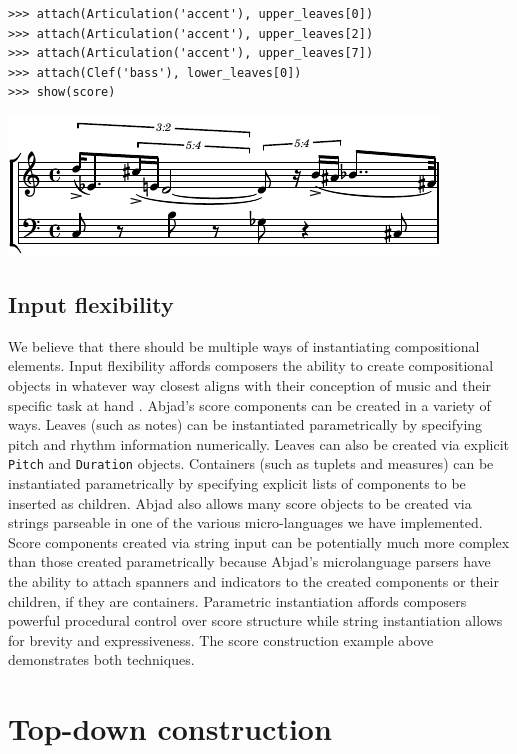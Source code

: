 \documentclass{article}
\begin{document}
\begin{lstlisting}
>>> attach(Articulation('accent'), upper_leaves[0])
>>> attach(Articulation('accent'), upper_leaves[2])
>>> attach(Articulation('accent'), upper_leaves[7])
>>> attach(Clef('bass'), lower_leaves[0])
>>> show(score)
\end{lstlisting}
\includegraphics{assets/lilypond-6e6234ddf98e707d42a58b6306767fc8.pdf}

\subsection{Input flexibility}

We believe that there should be multiple ways of instantiating compositional
elements. Input flexibility affords composers the ability to create
compositional objects in whatever way closest aligns with their conception of
music and their specific task at hand \cite{Kay:1996vn}. Abjad's score components
can be created in a variety of ways. Leaves (such as notes) can be instantiated
parametrically by specifying pitch and rhythm information numerically. Leaves
can also be created via explicit \texttt{Pitch} and \texttt{Duration} objects.
Containers (such as tuplets and measures) can be instantiated parametrically by
specifying explicit lists of components to be inserted as children. Abjad also
allows many score objects to be created via strings parseable in one of the
various micro-languages we have implemented. Score components created via
string input can be potentially much more complex than those created
parametrically because Abjad's microlanguage parsers have the ability to attach
spanners and indicators to the created components or their children, if they
are containers. Parametric instantiation affords composers powerful procedural
control over score structure while string instantiation allows for brevity and
expressiveness. The score construction example above demonstrates both
techniques.

\section{Top-down construction} \label{sec:top-down}
\end{document}
